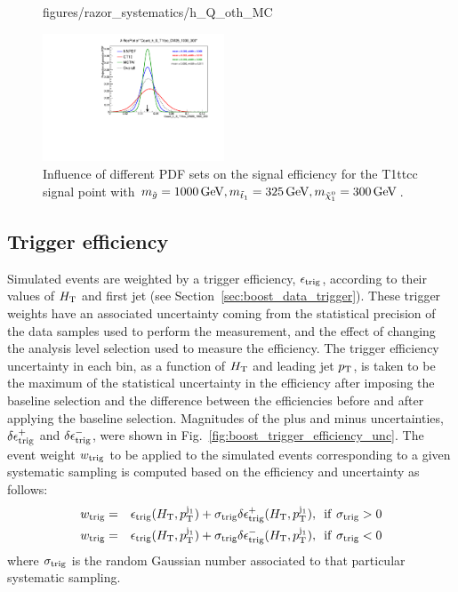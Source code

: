 \begin{figure}[p]
{figures/razor_systematics/h_Q_oth_MC}
\caption{Influence of different PDF sets on the MC counts in the $W$ (left) and $Q$ (right) region
for the backgrounds that are taken directly from the simulation.
\label{fig:PDF_effect_on_bg_oth2}}
\vspace{2eM}
\includegraphics[width=0.48\textwidth,clip=true,trim=0 0.2cm 0 1.2cm]
{figures/razor_systematics/h_S_T1ttcc_DM25_1000_300}
\caption{Influence of different PDF sets on the signal efficiency for the T1ttcc signal point with
$m_{\tilde{g}}=1000\,\text{Ge\hspace{-.08em}V}, m_{\tilde{t}_1}=325\,\text{Ge\hspace{-.08em}V}, m_{\tilde{\chi}_1^0}=300\,\text{Ge\hspace{-.08em}V}$. 
\label{fig:PDF_effect_on_sig}}
\end{figure}


\subsection{Trigger efficiency}  

Simulated events are weighted by a trigger efficiency, $\epsilon_{\rm trig}$, according to their
values of $H_{\mathrm{T}}$ and first jet \pt (see Section~\ref{sec:boost_data_trigger}). These trigger weights
have an associated uncertainty coming from the statistical precision of the data samples used to
perform the measurement, and the effect of changing the analysis level selection used to measure the
efficiency. The trigger efficiency uncertainty in each bin, as a function of $H_{\mathrm{T}}$
and leading jet $p_{\mathrm{T}}$, is taken to be the maximum of the statistical uncertainty in the efficiency
after imposing the baseline selection and the difference between the efficiencies before and after
applying the baseline selection. 
Magnitudes of the plus and minus uncertainties, $\delta\epsilon^+_{\rm trig}$ and
$\delta\epsilon^-_{\rm trig}$, were shown in Fig.~\ref{fig:boost_trigger_efficiency_unc}.
The event weight $w_{\rm trig}$ to be applied to the simulated events corresponding to a given
systematic sampling is computed based on the efficiency and uncertainty as follows:
\begin{eqnarray}
w_{\rm trig} & = & \epsilon_{\rm trig}(H_{\mathrm{T}}, p_{\mathrm{T}}^{{\rm j}_1}) + \sigma_{\rm trig}
\delta\epsilon^+_{\rm trig}(H_{\mathrm{T}}, p_{\mathrm{T}}^{{\rm j}_1}), \,\,\, {\rm if} \,\, \sigma_{\rm trig} > 0 \\ 
w_{\rm trig} & = & \epsilon_{\rm trig}(H_{\mathrm{T}}, p_{\mathrm{T}}^{{\rm j}_1}) + \sigma_{\rm trig}
\delta\epsilon^-_{\rm trig}(H_{\mathrm{T}}, p_{\mathrm{T}}^{{\rm j}_1}), \,\,\, {\rm if} \,\, \sigma_{\rm trig} < 0 
\end{eqnarray}
where $\sigma_{\rm trig}$ is the random Gaussian number associated to that particular
systematic sampling.	


